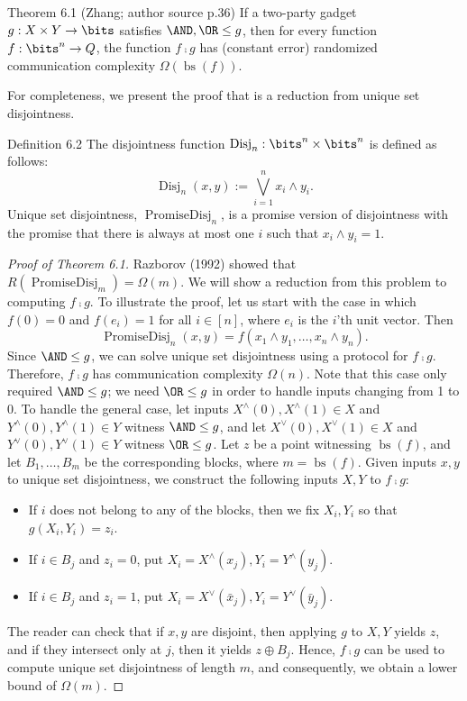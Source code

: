 \begin{originalresult}{Theorem 6.1 (Zhang; author source p.36)}
If a two-party gadget $g:X\times Y\to\bits$ satisfies $\AND,\OR\le g$, then for every function $f:\bits^n\to Q$, the function $f\comp g$ has (constant error) randomized communication complexity $\Omega(\operatorname{bs}(f))$.
\end{originalresult}
For completeness, we present the proof that is a reduction from unique set disjointness.
\begin{originalresult}{Definition 6.2}
The disjointness function $\operatorname{Disj}_n:\bits^n\times\bits^n$ is defined as follows:
\[\operatorname{Disj}_n(x,y):=\bigvee_{i=1}^n x_i\wedge y_i.\]
Unique set disjointness, $\operatorname{PromiseDisj}_n$, is a promise version of disjointness with the promise that there is always at most one $i$ such that $x_i\wedge y_i=1$.
\end{originalresult}
\begin{proof}[Proof of Theorem 6.1]
Razborov (1992) showed that $R(\operatorname{PromiseDisj}_m)=\Omega(m)$. We will show a reduction from this problem to computing $f\comp g$. To illustrate the proof, let us start with the case in which $f(0)=0$ and $f(e_i)=1$ for all $i\in[n]$, where $e_i$ is the $i$'th unit vector. Then
\[\operatorname{PromiseDisj}_n(x,y)=f(x_1\wedge y_1,\ldots,x_n\wedge y_n).\]
Since $\AND\le g$, we can solve unique set disjointness using a protocol for $f\comp g$. Therefore, $f\comp g$ has communication complexity $\Omega(n)$. Note that this case only required $\AND\le g$; we need $\OR\le g$ in order to handle inputs changing from 1 to 0.
To handle the general case, let inputs $X^\wedge(0),X^\wedge(1)\in X$ and $Y^\wedge(0),Y^\wedge(1)\in Y$ witness $\AND\le g$, and let $X^\vee(0),X^\vee(1)\in X$ and $Y^\vee(0),Y^\vee(1)\in Y$ witness $\OR\le g$.
Let $z$ be a point witnessing $\operatorname{bs}(f)$, and let $B_1,\ldots,B_m$ be the corresponding blocks, where $m=\operatorname{bs}(f)$. Given inputs $x,y$ to unique set disjointness, we construct the following inputs $X,Y$ to $f\comp g$:
\begin{itemize}
\item If $i$ does not belong to any of the blocks, then we fix $X_i,Y_i$ so that $g(X_i,Y_i)=z_i$.
\item If $i\in B_j$ and $z_i=0$, put $X_i=X^\wedge(x_j),Y_i=Y^\wedge(y_j)$.
\item If $i\in B_j$ and $z_i=1$, put $X_i=X^\vee(\bar x_j),Y_i=Y^\vee(\bar y_j)$.
\end{itemize}
The reader can check that if $x,y$ are disjoint, then applying $g$ to $X,Y$ yields $z$, and if they intersect only at $j$, then it yields $z\oplus B_j$. Hence, $f\comp g$ can be used to compute unique set disjointness of length $m$, and consequently, we obtain a lower bound of $\Omega(m)$.
\end{proof}
